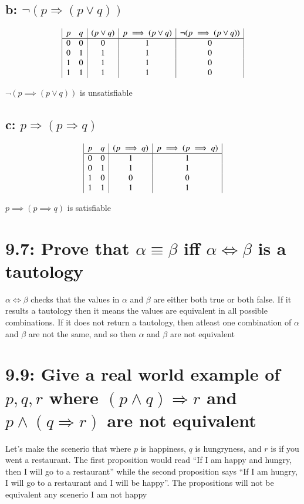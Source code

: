 \documentclass{article}
\begin{document}
\subsection*{b: $\neg (p \Rightarrow (p \vee q))$}
\begin{displaymath}
  \begin{array}{|c c|c|c|c|}
    p & q & (p \lor q) & p \implies (p \lor q) & \neg(p \implies (p \lor q))\\
    \hline
    0 & 0 & 0 & 1 & 0\\
    0 & 1 & 1 & 1 & 0\\
    1 & 0 & 1 & 1 & 0\\
    1 & 1 & 1 & 1 & 0\\
  \end{array}
\end{displaymath}

$\neg(p \implies (p \lor q))$ is unsatisfiable
\subsection*{c: $p \Rightarrow (p \Rightarrow q)$}
\begin{displaymath}
  \begin{array}{|c c|c|c|}
    p & q & (p \implies q) & p \implies (p \implies q)\\
    \hline
    0 & 0 & 1 & 1\\
    0 & 1 & 1 & 1\\
    1 & 0 & 0 & 0\\
    1 & 1 & 1 & 1\\
  \end{array}
\end{displaymath}

$p \implies (p \implies q)$ is satisfiable
\section*{9.7: Prove that $\alpha \equiv \beta$ iff $\alpha \Leftrightarrow \beta$ is a tautology}
$\alpha \Leftrightarrow \beta$ checks that the values in $\alpha$ and $\beta$  are either both true or both false. If it results a tautology then it means the values are equivalent in all possible combinations. If it does not return a tautology, then atleast one combination of $\alpha$ and $\beta$ are not the same, and so then $\alpha$ and $\beta$ are not equivalent  
\section*{9.9: Give a real world example of $p, q, r$ where $(p \wedge q) \Rightarrow r$ and $p \wedge (q \Rightarrow r)$ are not equivalent}
Let's make the scenerio that where $p$ is happiness, $q$ is hungryness, and $r$ is if you went a restaurant. The first proposition would read ``If I am happy and hungry, then I will go to a restaurant'' while the second proposition says ``If I am hungry, I will go to a restaurant and I will be happy''. The propositions will not be equivalent any scenerio I am not happy
\end{document}
